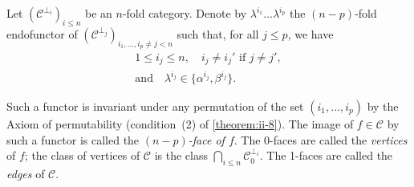 \documentclass[a4paper,fleqn]{article}
\theoremstyle{plain}
\theoremstyle{definition}
\renewcommand{\leq}{\leqslant}
\newcommand{\CC}{\mathcal{C}}
\begin{document}
Let $(\CC^{\perp_i})_{i\leq n}$ be an $n$-fold category.
Denote by $\lambda^{i_1}\ldots\lambda^{i_p}$ the $(n-p)$-fold endofunctor of $(\CC^{\perp_j})_{i_1,\ldots,i_p\neq j<n}$ such that, for all $j\leq p$, we have
\[
  \begin{gathered}
    1\leq i_j\leq n,
    \quad i_j\neq i_j'\text{ if }j\neq j',
  \\\text{and}\quad\lambda^{i_j}\in\{\alpha^{i_j},\beta^{i_j}\}.
  \end{gathered}
\]

Such a functor is invariant under any permutation of the set $(i_1,\ldots,i_p)$ by the Axiom of permutability (condition~(2) of \cref{theorem:ii-8}).
The image of $f\in\CC$ by such a functor is called the \emph{$(n-p)$-face of $f$}.
The 0-faces are called the \emph{vertices} of $f$;
the class of vertices of $\CC$ is the class $\bigcap_{i\leq n}\CC_0^{\perp_i}$.
The 1-faces are called the \emph{edges} of $\CC$.
\end{document}
